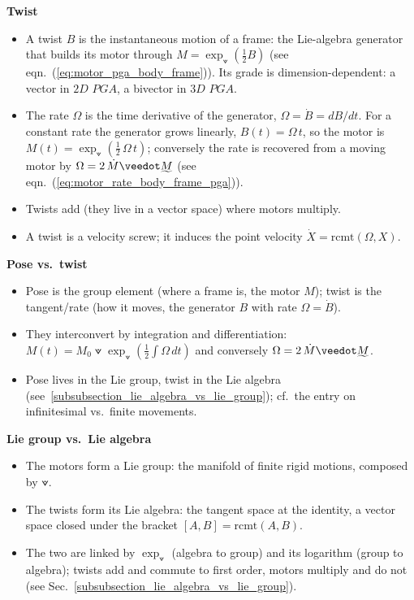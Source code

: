 
\textbf{Twist}
\begin{itemize}
    \item A twist $B$ is the instantaneous motion of a frame: the Lie-algebra generator
    that builds its motor through $M = \exp_\veedot(\frac{1}{2} B)$ (see
    eqn.~(\ref{eq:motor_pga_body_frame})). Its grade is dimension-dependent: a vector in
    $2D$ $PGA$, a bivector in $3D$ $PGA$.

    \item The rate $\Omega$ is the time derivative of the generator, $\Omega = \dot{B} =
    dB/dt$. For a constant rate the generator grows linearly, $B(t) = \Omega\,t$, so the
    motor is $M(t) = \exp_\veedot(\frac{1}{2}\,\Omega\,t)$; conversely the rate is recovered
    from a moving motor by $\Omega = 2\,\dot{M} \veedot \rrev{M}$ (see
    eqn.~(\ref{eq:motor_rate_body_frame_pga})).

    \item Twists add (they live in a vector space) where motors multiply.

    \item A twist is a velocity screw; it induces the point velocity
    $\dot{X} = \mathrm{rcmt}(\Omega, X)$.
\end{itemize}

\textbf{Pose vs.\ twist}
\begin{itemize}
    \item Pose is the group element (where a frame is, the motor $M$); twist is the
    tangent/rate (how it moves, the generator $B$ with rate $\Omega = \dot{B}$).

    \item They interconvert by integration and differentiation: $M(t) = M_0 \veedot
    \exp_\veedot(\frac{1}{2} \int \Omega\,dt)$ and conversely $\Omega = 2\,\dot{M} \veedot
    \rrev{M}$.

    \item Pose lives in the Lie group, twist in the Lie algebra
    (see~\ref{subsubsection_lie_algebra_vs_lie_group}); cf.\ the entry on infinitesimal
    vs.\ finite movements.
\end{itemize}

\textbf{Lie group vs.\ Lie algebra}
\begin{itemize}
    \item The motors form a Lie group: the manifold of finite rigid motions, composed by
    $\veedot$.

    \item The twists form its Lie algebra: the tangent space at the identity, a vector
    space closed under the bracket $[A,B] = \mathrm{rcmt}(A,B)$.

    \item The two are linked by $\exp_\veedot$ (algebra to group) and its logarithm (group
    to algebra); twists add and commute to first order, motors multiply and do not (see
    Sec.~\ref{subsubsection_lie_algebra_vs_lie_group}).
\end{itemize}

